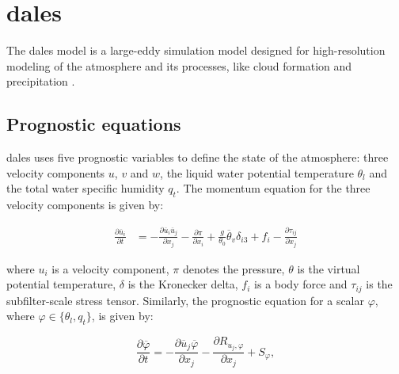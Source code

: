 \section{\acrshort{dales}}
The \acrfull{dales} model is a large-eddy simulation model designed for high-resolution modeling of the atmosphere and its processes, like cloud formation and precipitation \citep{heusFormulationDutchAtmospheric2010,ouwerslootLargeEddySimulationComparison2017}. 

\subsection{Prognostic equations}
\acrshort{dales} uses five prognostic variables to define the state of the atmosphere: three velocity components $u$, $v$ and $w$, the liquid water potential temperature $\theta_l$ and the total water specific humidity $q_t$. The momentum equation for the three velocity components is given by: 



\begin{align}
    \frac{\partial \overline{u}_i}{\partial t} &= - \frac{\partial \overline{u}_i \overline{u}_j}{\partial x_j} - \frac{\partial \pi}{\partial x_i} + \frac{g}{\theta_0}\overline{\theta}_v \delta_{i3} + f_i - \frac{\partial \tau_{ij}}{\partial x_j} \label{eq:momentum_conservation}
\end{align}

where $u_i$ is a velocity component, $\pi$ denotes the pressure, $\theta$ is the virtual potential temperature, $\delta$ is the Kronecker delta, $f_i$ is a body force and $\tau_{ij}$ is the subfilter-scale stress tensor. Similarly, the prognostic equation for a scalar $\varphi$, where $\varphi \in \{\theta_l, q_t\}$, is given by:

\begin{equation}
    \frac{\partial \overline{\varphi}}{\partial t} = - \frac{\partial \overline{u}_j \overline{\varphi}}{\partial x_j} - \frac{\partial R_{u_j,\varphi}}{\partial x_j} + S_\varphi,
\end{equation}


